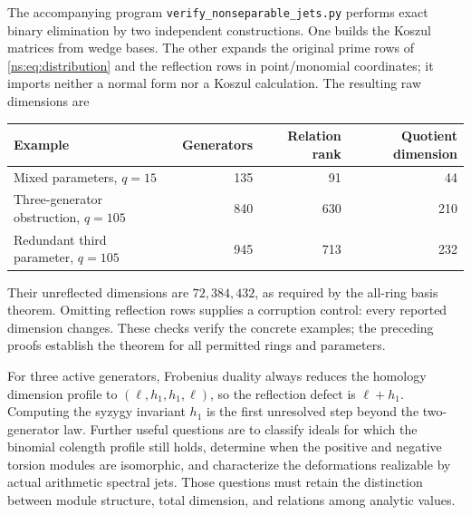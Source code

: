 The accompanying program \texttt{verify\_nonseparable\_jets.py} performs exact
binary elimination by two independent constructions. One builds the Koszul
matrices from wedge bases. The other expands the original prime rows of
\eqref{ns:eq:distribution} and the reflection rows in point/monomial
coordinates; it imports neither a normal form nor a Koszul calculation.
The resulting raw dimensions are
\begin{center}
\begin{tabular}{lrrr}
\hline
Example & Generators & Relation rank & Quotient dimension\\
\hline
Mixed parameters, $q=15$ &135&91&44\\
Three-generator obstruction, $q=105$ &840&630&210\\
Redundant third parameter, $q=105$ &945&713&232\\
\hline
\end{tabular}
\end{center}
Their unreflected dimensions are $72,384,432$, as required by the all-ring
basis theorem. Omitting reflection rows supplies a corruption control:
every reported dimension changes. These checks verify the concrete examples;
the preceding proofs establish the theorem for all permitted rings and
parameters.

For three active generators, Frobenius duality always reduces the homology
dimension profile to $(\ell,h_1,h_1,\ell)$, so the reflection defect is
$\ell+h_1$. Computing the syzygy invariant $h_1$ is the first unresolved step
beyond the two-generator law. Further useful questions are to classify ideals
for which the binomial colength profile still holds, determine when the
positive and negative torsion modules are isomorphic, and characterize the
deformations realizable by actual arithmetic spectral jets. Those questions
must retain the distinction between module structure, total dimension, and
relations among analytic values.
